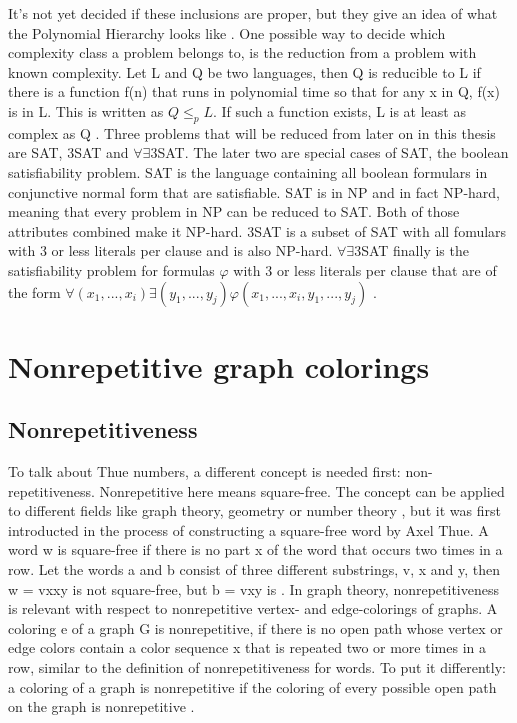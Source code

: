 \documentclass[12pt,a4paper]{article}
\begin{document}
It's not yet decided if these inclusions are proper, but they give an idea of what the Polynomial Hierarchy looks like \citep{Stockmeyer1976}.
\newline
One possible way to decide which complexity class a problem belongs to, is the reduction from a problem with known complexity. Let L and Q be two languages, then Q is reducible to L if there is a function f(n) that runs in polynomial time so that for any x in Q, f(x) is in L. This is written as $Q \leq_p L$. If such a function exists, L is at least as complex as Q \citep{Davis1983}. 
\newline
Three problems that will be reduced from later on in this thesis are SAT, 3SAT and $\forall \exists$3SAT. The later two are special cases of SAT, the boolean satisfiability problem. SAT is the language containing all boolean formulars in conjunctive normal form that are satisfiable. SAT is in NP and in fact NP-hard, meaning that every problem in NP can be reduced to SAT. Both of those attributes combined make it NP-hard. 3SAT is a subset of SAT with all fomulars with 3 or less literals per clause and is also NP-hard. $\forall \exists$3SAT finally is the satisfiability problem for formulas $\varphi$ with 3 or less literals per clause that are of the form $\forall (x_1, ..., x_i) \exists (y_1, ..., y_j) \varphi(x_1, ..., x_i, y_1, ..., y_j)$ \citep{Schaefer2002}.

\newpage
\section{Nonrepetitive graph colorings}
\subsection{Nonrepetitiveness}
To talk about Thue numbers, a different concept is needed first: non-repetitiveness. Nonrepetitive here means square-free. The concept can be applied to different fields like graph theory, geometry or number theory \citep{Grytczuk2008}, but it was first introducted in the process of constructing a square-free word by Axel Thue. A word w is square-free if there is no part x of the word that occurs two times in a row. Let the words a and b consist of three different substrings, v, x and y, then w = vxxy is not square-free, but b = vxy is \citep{Thue1906}.
\newline
In graph theory, nonrepetitiveness is relevant with respect to nonrepetitive vertex- \citep{Marx2009} and edge-colorings of graphs. A coloring e of a graph G is nonrepetitive, if there is no open path whose vertex or edge colors contain a color sequence x that is repeated two or more times in a row, similar to the definition of nonrepetitiveness for words. To put it differently: a coloring of a graph is nonrepetitive if the coloring of every possible open path on the graph is nonrepetitive \citep{Alon2002}.
\end{document}
